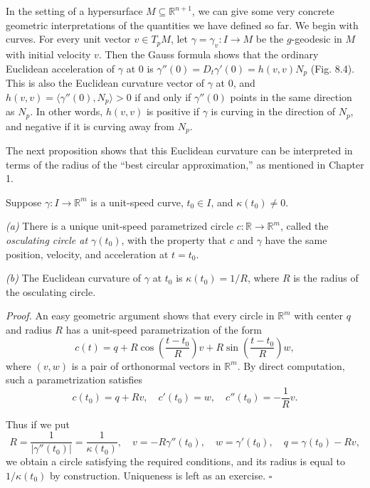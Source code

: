 In the setting of a hypersurface $M \subseteq \mathbb{R}^{n+1}$, we can give some very concrete geometric interpretations of the quantities we have defined so far. We begin with curves. For every unit vector $v \in T_p M$, let $\gamma = \gamma_v : I \to M$ be the $g$-geodesic in $M$ with initial velocity $v$. Then the Gauss formula shows that the ordinary Euclidean acceleration of $\gamma$ at $0$ is $\gamma''(0) = D_t \gamma'(0) = h(v,v)N_p$ (Fig. 8.4). This is also the Euclidean curvature vector of $\gamma$ at $0$, and $h(v,v) = \langle \gamma''(0), N_p \rangle > 0$ if and only if $\gamma''(0)$ points in the same direction as $N_p$. In other words, $h(v,v)$ is positive if $\gamma$ is curving in the direction of $N_p$, and negative if it is curving away from $N_p$.

The next proposition shows that this Euclidean curvature can be interpreted in terms of the radius of the ``best circular approximation,'' as mentioned in Chapter 1.

\begin{proposition}
\label{prop:osculating-circle}
Suppose $\gamma: I \to \mathbb{R}^m$ is a unit-speed curve, $t_0 \in I$, and $\kappa(t_0) \neq 0$.

\emph{(a)} There is a unique unit-speed parametrized circle $c: \mathbb{R} \to \mathbb{R}^m$, called the \emph{osculating circle at $\gamma(t_0)$}, with the property that $c$ and $\gamma$ have the same position, velocity, and acceleration at $t = t_0$.

\emph{(b)} The Euclidean curvature of $\gamma$ at $t_0$ is $\kappa(t_0) = 1/R$, where $R$ is the radius of the osculating circle.
\end{proposition}

\emph{Proof.} An easy geometric argument shows that every circle in $\mathbb{R}^m$ with center $q$ and radius $R$ has a unit-speed parametrization of the form
\[
c(t) = q + R \cos\left(\frac{t - t_0}{R}\right)v + R \sin\left(\frac{t - t_0}{R}\right)w,
\]
where $(v, w)$ is a pair of orthonormal vectors in $\mathbb{R}^m$. By direct computation, such a parametrization satisfies
\[
c(t_0) = q + Rv, \quad c'(t_0) = w, \quad c''(t_0) = -\frac{1}{R}v.
\]

Thus if we put
\[
R = \frac{1}{|\gamma''(t_0)|} = \frac{1}{\kappa(t_0)}, \quad v = -R\gamma''(t_0), \quad w = \gamma'(t_0), \quad q = \gamma(t_0) - Rv,
\]
we obtain a circle satisfying the required conditions, and its radius is equal to $1/\kappa(t_0)$ by construction. Uniqueness is left as an exercise. $\square$

